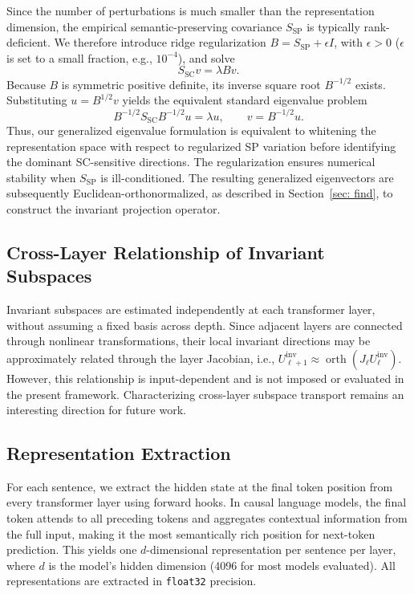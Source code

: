 Since the number of perturbations is much smaller than the representation dimension, the empirical semantic-preserving covariance $S_{\mathrm{SP}}$ is typically rank-deficient. We therefore introduce ridge regularization $B=S_{\mathrm{SP}}+\epsilon I$, with $\epsilon>0$ ($\epsilon$ is set to a small fraction, e.g., $10^{-4}$), and solve
\begin{equation}
S_{\mathrm{SC}}v=\lambda Bv.
\end{equation}
Because $B$ is symmetric positive definite, its inverse square root $B^{-1/2}$ exists. Substituting $u=B^{1/2}v$ yields the equivalent standard eigenvalue problem
\begin{equation}
B^{-1/2}S_{\mathrm{SC}}B^{-1/2}u=\lambda u,
\qquad v=B^{-1/2}u.
\end{equation}
Thus, our generalized eigenvalue formulation is equivalent to whitening the representation space with respect to regularized SP variation before identifying the dominant SC-sensitive directions. The regularization ensures numerical stability when $S_{\mathrm{SP}}$ is ill-conditioned. The resulting generalized eigenvectors are subsequently Euclidean-orthonormalized, as described in Section~\ref{sec: find}, to construct the invariant projection operator.


\subsection{Cross-Layer Relationship of Invariant Subspaces}

Invariant subspaces are estimated independently at each transformer layer, without assuming a fixed basis across depth. Since adjacent layers are connected through nonlinear transformations, their local invariant directions may be approximately related through the layer Jacobian, i.e., $U_{\ell+1}^{\mathrm{inv}}\approx\operatorname{orth}(J_\ell U_\ell^{\mathrm{inv}})$. However, this relationship is input-dependent and is not imposed or evaluated in the present framework. Characterizing cross-layer subspace transport remains an interesting direction for future work.


\subsection{Representation Extraction}
For each sentence, we extract the hidden state at the final token position from every transformer layer using forward hooks. In causal language models, the final token attends to all preceding tokens and aggregates contextual information from the full input, making it the most semantically rich position for next-token prediction. This yields one $d$-dimensional representation per sentence per layer, where $d$ is the model's hidden dimension (4096 for most models evaluated). All representations are extracted in \texttt{float32} precision.

